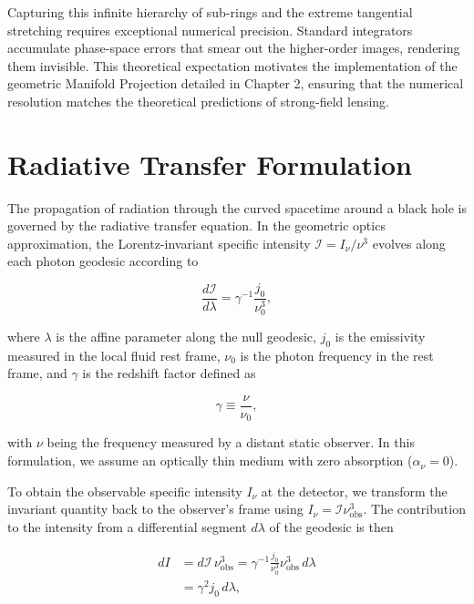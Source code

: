 \documentclass[11pt]{book}
\begin{document}
Capturing this infinite hierarchy of sub-rings and the extreme tangential stretching requires exceptional numerical precision. Standard integrators accumulate phase-space errors that smear out the higher-order images, rendering them invisible. This theoretical expectation motivates the implementation of the geometric Manifold Projection detailed in Chapter 2, ensuring that the numerical resolution matches the theoretical predictions of strong-field lensing.

\section{Radiative Transfer Formulation}
\label{sec:radiative_transfer}

The propagation of radiation through the curved spacetime around a black hole is governed by the radiative transfer equation. In the geometric optics approximation, the Lorentz-invariant specific intensity $\mathcal{I} = I_\nu/\nu^3$ evolves along each photon geodesic according to

\begin{equation}
	\frac{d\mathcal{I}}{d\lambda} = \gamma^{-1} \frac{j_0}{\nu_0^3},
	\label{eq:rt_invariant}
\end{equation}

where $\lambda$ is the affine parameter along the null geodesic, $j_0$ is the emissivity measured in the local fluid rest frame, $\nu_0$ is the photon frequency in the rest frame, and $\gamma$ is the redshift factor defined as

\begin{equation}
	\gamma \equiv \frac{\nu}{\nu_0},
	\label{eq:redshift_factor}
\end{equation}

with $\nu$ being the frequency measured by a distant static observer. In this formulation, we assume an optically thin medium with zero absorption ($\alpha_\nu = 0$).

To obtain the observable specific intensity $I_\nu$ at the detector, we transform the invariant quantity back to the observer's frame using $I_\nu = \mathcal{I} \nu_{\mathrm{obs}}^3$. The contribution to the intensity from a differential segment $d\lambda$ of the geodesic is then

\begin{equation}
	\begin{split}
		dI &= d\mathcal{I} \, \nu_{\mathrm{obs}}^3 = \gamma^{-1} \frac{j_0}{\nu_0^3} \nu_{\mathrm{obs}}^3 \, d\lambda \\
		&= \gamma^2 j_0 \, d\lambda,
	\end{split}
	\label{eq:intensity_contribution}
\end{equation}
\end{document}
